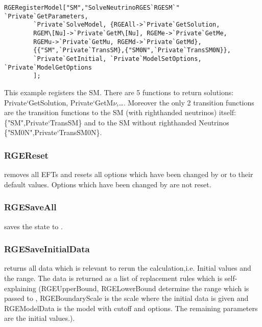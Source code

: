 \documentclass[10pt,a4paper,twoside]{scrartcl}
\begin{document}
\begin{verbatim}
RGERegisterModel["SM","SolveNeutrinoRGES`RGESM`" `Private`GetParameters,
        `Private`SolveModel, {RGEAll->`Private`GetSolution,
        RGEM\[Nu]->`Private`GetM\[Nu], RGEMe->`Private`GetMe,
        RGEMu->`Private`GetMu, RGEMd->`Private`GetMd},
        {{"SM",`Private`TransSM},{"SM0N",`Private`TransSM0N}},
        `Private`GetInitial, `Private`ModelSetOptions, `Private`ModelGetOptions
        ];
\end{verbatim}

This example registers the SM.  There are 5 functions to return solutions:
Private`GetSolution, Private`GetM$\nu$,\dots. Moreover the only 2 transition
functions are the transition functions to the SM (with righthanded neutrinos)
itself: \{"SM",Private`TransSM\} and to the SM without righthanded Neutrinos
\{"SM0N",Private`TransSM0N\}.



\subsubsection{RGEReset}

 removes all EFTs and resets all options which have
been changed by  or 
to their default values. 
Options which have been changed by
 are not reset.

\subsubsection{RGESaveAll}

 saves the state to .

\subsubsection{RGESaveInitialData}

 returns all data which is relevant to rerun the
calculation,i.e. Initial values and the range. The data is returned as a list of replacement rules which
is self-explaining (RGEUpperBound, RGELowerBound determine the range which is
passed to , RGEBoundaryScale is the scale where the
initial data is given and RGEModelData is the model with cutoff and options. The remaining parameters are the initial values.).
\end{document}
